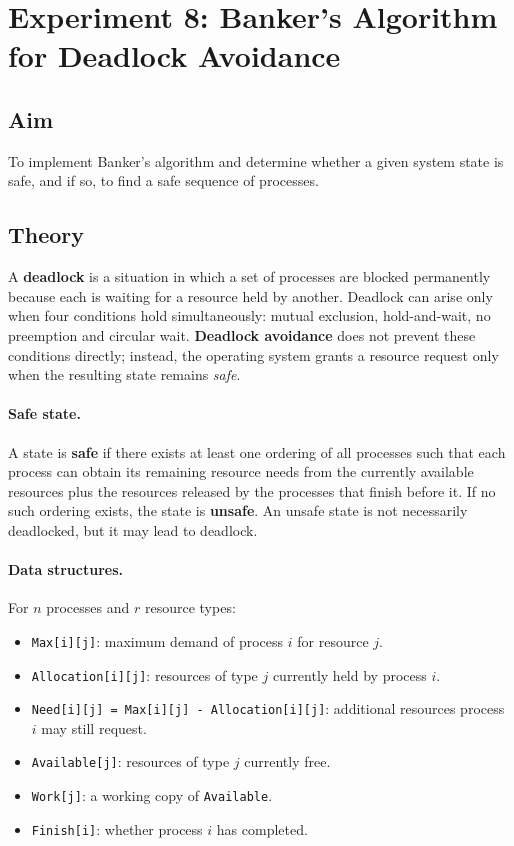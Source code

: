 \setcounter{section}{7}
\section{Experiment 8: Banker's Algorithm for Deadlock Avoidance}
\label{exp:bankers}

\subsection*{Aim}
To implement Banker's algorithm and determine whether a given system state is safe, and if so, to find a safe sequence of processes.

\subsection*{Theory}
A \textbf{deadlock} is a situation in which a set of processes are blocked permanently because each is waiting for a resource held by another. Deadlock can arise only when four conditions hold simultaneously: mutual exclusion, hold-and-wait, no preemption and circular wait. \textbf{Deadlock avoidance} does not prevent these conditions directly; instead, the operating system grants a resource request only when the resulting state remains \emph{safe}.

\paragraph{Safe state.}
A state is \textbf{safe} if there exists at least one ordering of all processes such that each process can obtain its remaining resource needs from the currently available resources plus the resources released by the processes that finish before it. If no such ordering exists, the state is \textbf{unsafe}. An unsafe state is not necessarily deadlocked, but it may lead to deadlock.

\paragraph{Data structures.}
For $n$ processes and $r$ resource types:
\begin{itemize}
    \item \texttt{Max[i][j]}: maximum demand of process $i$ for resource $j$.
    \item \texttt{Allocation[i][j]}: resources of type $j$ currently held by process $i$.
    \item \texttt{Need[i][j] = Max[i][j] - Allocation[i][j]}: additional resources process $i$ may still request.
    \item \texttt{Available[j]}: resources of type $j$ currently free.
    \item \texttt{Work[j]}: a working copy of \texttt{Available}.
    \item \texttt{Finish[i]}: whether process $i$ has completed.
\end{itemize}

